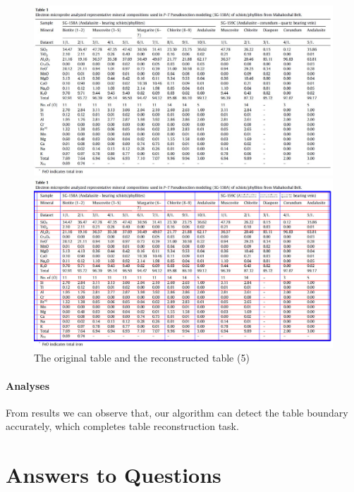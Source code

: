 \documentclass[12pt, a4paper]{article}
\theoremstyle{definition}
\begin{document}
\begin{figure}[htbp]
	\centering
		\begin{minipage}[t]{0.9\linewidth}
		\centering
		\includegraphics[width=\linewidth]{5.jpg}
		\end{minipage}
		\linebreak 
		\begin{minipage}[t]{0.9\linewidth}
		\centering
		\includegraphics[width=\linewidth]{reconstructed_5.png}
		\end{minipage}
	\caption{The original table and the reconstructed table (5)}
	\label{fig5}
\end{figure}

\paragraph{Analyses} From results we can observe that, our algorithm can detect the table boundary accurately, which completes table reconstruction task.

\section{Answers to Questions}
\end{document}
